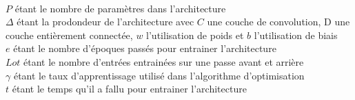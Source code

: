 \begin{multicols}{2}
 \\

{\scriptsize
$P$ étant le nombre de paramètres dans l'architecture\\

$\Delta$ étant la prodondeur de l'architecture avec $C$ une couche de convolution, D une couche entièrement connectée, $w$ l'utilisation de poids et $b$ l'utilisation de biais \\

$e$ étant le nombre d'époques passés pour entrainer l'architecture \\

$Lot$ étant le nombre d'entrées entrainées sur une passe avant et arrière \\

$\gamma$ étant le taux d'apprentissage utilisé dans l'algorithme d'optimisation \\

$t$ étant le temps qu'il a fallu pour entrainer l'architecture \\

}
\end{multicols}
